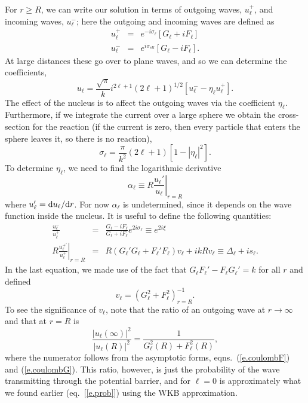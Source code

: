For $r \geq R$, we can write our solution in terms of outgoing waves, $u_{\ell}^{+}$, and incoming waves, $u_{\ell}^{-}$; here the outgoing and incoming waves are defined as 
\begin{eqnarray*}
u_{\ell}^{+} &=& e^{-i\sigma_{\ell}}\left[G_{\ell} + i F_{\ell}\right]\\
u_{\ell}^{-} &=& e^{i\sigma_{ell}}\left[G_{\ell} - i F_{\ell}\right].
\end{eqnarray*}
At large distances these go over to plane waves,  and so we can determine the coefficients,
\begin{equation}\label{e.coulomb-solution}
u_{\ell} = \frac{\sqrt{\pi}}{k}i^{2\ell + 1}(2\ell +1)^{1/2}\left[u_{\ell}^{-} - \eta_{\ell}u_{\ell}^{+}\right].
\end{equation}
The effect of the nucleus is to affect the outgoing waves via the coefficient $\eta_{\ell}$.  Furthermore, if we integrate the current over a large sphere we obtain the cross-section for the reaction (if the current is zero, then every particle that enters the sphere leaves it, so there is no reaction),
\begin{equation}\label{e.cross-section-eta}
\sigma_{\ell} = \frac{\pi}{k^{2}}(2\ell +1) \left[ 1 - |\eta_{\ell}|^{2}\right].
\end{equation}
To determine $\eta_{\ell}$, we need to find the logarithmic derivative
\[
\alpha_{\ell} \equiv R\left.\frac{u_{\ell}'}{u_{\ell}}\right|_{r=R}
\]
where $u_{\ell}' = \mathrm{d} u_{\ell}/\mathrm{d} r$.  For now $\alpha_{\ell}$ is undetermined, since it depends on the wave function inside the nucleus.  It is useful to define the following quantities:
\begin{eqnarray}\label{e.coulombPhase}
\frac{u_{\ell}^{-}}{u_{\ell}^{+}} & = & \frac{G_{\ell} - i F_{\ell}}{G_{\ell} + i F_{\ell}}e^{2i\sigma_{\ell}} \equiv e^{2i\xi}\\
R\left.\frac{u_{\ell}^{+'}}{u_{\ell}^{+}}\right|_{r=R} &=& R(G_{\ell}'G_{\ell} + F_{\ell}'F_{\ell})v_{\ell} + i kR v_{\ell} \equiv \Delta_{\ell} + is_{\ell}.
\label{e.delta-s}
\end{eqnarray}
In the last equation, we made use of the fact that $G_{\ell}F_{\ell}' - F_{\ell}G_{\ell}' = k$ for all $r$ and defined
\[
v_{\ell} = \left(G_{\ell}^{2} + F_{\ell}^{2}\right)^{-1}_{r=R}.
\]
To see the significance of $v_{\ell}$, note that the ratio of an outgoing wave at $r\to\infty$ and that at $r=R$ is
\[
\frac{|u_{\ell}(\infty)|^{2}}{|u_{\ell}(R)|^{2}} = \frac{1}{G_{\ell}^{2}(R) + F_{\ell}^{2}(R)},
\]
where the numerator follows from the asymptotic forms, eqns.~(\ref{e.coulombF}) and (\ref{e.coulombG}). This ratio, however, is just the probability of the wave transmitting through the potential barrier, and for $\ell=0$ is approximately what we found earlier (eq.~[\ref{e.prob}]) using the WKB approximation.

